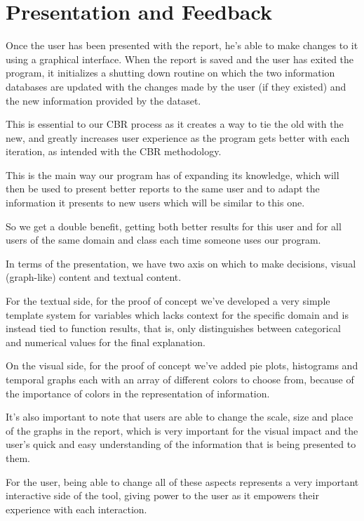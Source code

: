 \section{Presentation and Feedback}
\label{cap2:sec:feedback}

Once the user has been presented with the report, he's able to make changes to it using a graphical interface. When the report is saved and the user has exited the program, it initializes a shutting down routine on which the two information databases are updated with the changes made by the user (if they existed) and the new information provided by the dataset.

This is essential to our CBR process as it creates a way to tie the old with the new, and greatly increases user experience as the program gets better with each iteration, as intended with the CBR methodology.

This is the main way our program has of expanding its knowledge, which will then be used to present better reports to the same user and to adapt the information it presents to new users which will be similar to this one.

So we get a double benefit, getting both better results for this user and for all users of the same domain and class each time someone uses our program.

In terms of the presentation, we have two axis on which to make decisions, visual (graph-like) content and textual content.

For the textual side, for the proof of concept we've developed a very simple template system for variables which lacks context for the specific domain and is instead tied to function results, that is, only distinguishes between categorical and numerical values for the final explanation.

On the visual side, for the proof of concept we've added pie plots, histograms and temporal graphs each with an array of different colors to choose from, because of the importance of colors in the representation of information.

It's also important to note that users are able to change the scale, size and place of the graphs in the report, which is very important for the visual impact and the user's quick and easy understanding of the information that is being presented to them.

For the user, being able to change all of these aspects represents a very important interactive side of the tool, giving power to the user as it empowers their experience with each interaction.

